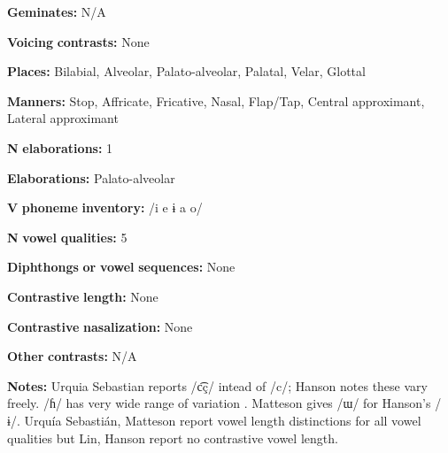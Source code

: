 \begin{styleBody}
\textbf{Geminates:} N/A
\end{styleBody}

\begin{styleBody}
\textbf{Voicing} \textbf{contrasts:} None
\end{styleBody}

\begin{styleBody}
\textbf{Places:} Bilabial, Alveolar, Palato-alveolar, Palatal, Velar, Glottal
\end{styleBody}

\begin{styleBody}
\textbf{Manners:} Stop, Affricate, Fricative, Nasal, Flap/Tap, Central approximant, Lateral approximant
\end{styleBody}

\begin{styleBody}
\textbf{N} \textbf{elaborations:} 1
\end{styleBody}

\begin{styleBody}
\textbf{Elaborations:} Palato-alveolar
\end{styleBody}

\begin{styleBody}
\textbf{V} \textbf{phoneme} \textbf{inventory:} /i e ɨ a o/
\end{styleBody}

\begin{styleBody}
\textbf{N} \textbf{vowel} \textbf{qualities:} 5
\end{styleBody}

\begin{styleBody}
\textbf{Diphthongs} \textbf{or} \textbf{vowel} \textbf{sequences:} None
\end{styleBody}

\begin{styleBody}
\textbf{Contrastive} \textbf{length:} None
\end{styleBody}

\begin{styleBody}
\textbf{Contrastive} \textbf{nasalization:} None
\end{styleBody}

\begin{styleBody}
\textbf{Other} \textbf{contrasts:} N/A
\end{styleBody}

\begin{styleBody}
\textbf{Notes:} Urquia Sebastian reports /c͡ç/ intead of /c/; Hanson notes these vary freely. /ɦ/ has very wide range of variation \citep[20-23]{Hanson2010}. Matteson gives /ɯ/ for Hanson’s /ɨ/. Urquía Sebastián, Matteson report vowel length distinctions for all vowel qualities but Lin, Hanson report no contrastive vowel length.
\end{styleBody}

